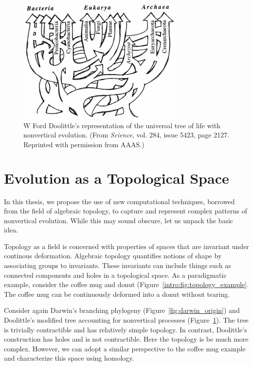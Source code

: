 \begin{figure}
\centering
\includegraphics[width=.8\columnwidth]{./fig/introduction/doolittle_tree.png}
\caption[Ford Doolittle's Tree]{W Ford Doolittle's representation of the universal tree of life with nonvertical evolution. (From \emph{Science}, vol. 284, issue 5423, page 2127. Reprinted with permission from AAAS.)}
\label{fig:doolittle_tree}
\end{figure}

\section{Evolution as a Topological Space}

In this thesis, we propose the use of new computational techniques, borrowed from the field of algebraic topology, to capture and represent complex patterns of nonvertical evolution.
While this may sound obscure, let us unpack the basic idea.

Topology as a field is concerned with properties of spaces that are invariant under continous deformation.
Algebraic topology quantifies notions of shape by associating groups to invariants.
These invariants can include things such as connected components and holes in a topological space.
As a paradigmatic example, consider the coffee mug and donut (Figure~\ref{intro:fig:topology_example}.
The coffee mug can be continuously deformed into a donut without tearing.

Consider again Darwin's branching phylogeny (Figure~\ref{fig:darwin_origin}) and Doolittle's modified tree accounting for nonvertical processes (Figure~\ref{fig:doolittle_tree}).
The tree is trivially contractible and has relatively simple topology.
In contrast, Doolittle's construction has holes and is not contractible.
Here the topology is be much more complex.
However, we can adopt a similar perspective to the coffee mug example and characterize this space using homology.

